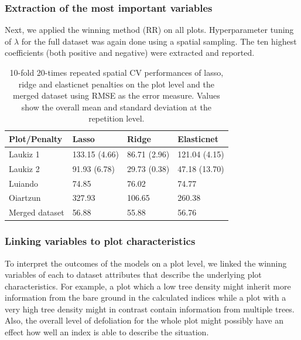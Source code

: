 \documentclass[review]{elsarticle}
\begin{document}
\subsubsection{Extraction of the most important variables}

Next, we applied the winning method (\ac{RR}) on all plots.
Hyperparameter tuning of $\lambda$ for the full dataset was again done using a spatial sampling.
The ten highest coefficients (both positive and negative) were extracted and reported.

\begin{table}[b!]
\centering
\caption[t]{10-fold 20-times repeated spatial \ac{CV} performances of lasso, ridge and elasticnet penalties on the plot level and the merged dataset using \ac{RMSE} as the error measure. Values show the overall mean and standard deviation at the repetition level.}
\begingroup\footnotesize
\begin{tabular}{llll}
	\\
	Plot/Penalty   & Lasso         & Ridge        & Elasticnet    \\
	\hline
	Laukiz 1       & 133.15 (4.66) & 86.71 (2.96) & 121.04 (4.15) \\
	Laukiz 2       & 91.93 (6.78)  & 29.73 (0.38) & 47.18 (13.70) \\
	Luiando        & 74.85         & 76.02        & 74.77         \\
	Oiartzun       & 327.93        & 106.65       & 260.38        \\
	Merged dataset & 56.88         & 55.88        & 56.76         \\
	\bottomrule
\end{tabular}
\endgroup
\label{tab:penalty_comparison}
\end{table}

\subsubsection{Linking variables to plot characteristics}

To interpret the outcomes of the models on a plot level, we linked the winning variables of each to dataset attributes that describe the underlying plot characteristics.
For example, a plot which a low tree density might inherit more information from the bare ground in the calculated indices while a plot with a very high tree density might in contrast contain information from multiple trees.
Also, the overall level of defoliation for the whole plot might possibly have an effect how well an index is able to describe the situation.
\end{document}
